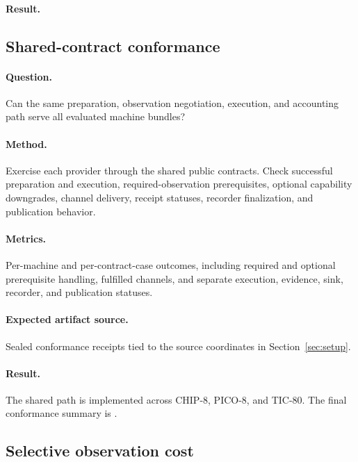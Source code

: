 \paragraph{Result.} \TBASourceCoordinates

\subsection{Shared-contract conformance}
\label{sec:conformance}

\paragraph{Question.} Can the same preparation, observation negotiation,
execution, and accounting path serve all evaluated machine bundles?

\paragraph{Method.} Exercise each provider through the shared public
contracts. Check successful preparation and execution, required-observation
prerequisites, optional capability downgrades, channel delivery, receipt
statuses, recorder finalization, and publication behavior.

\paragraph{Metrics.} Per-machine and per-contract-case outcomes, including
required and optional prerequisite handling, fulfilled channels, and
separate execution, evidence, sink, recorder, and publication statuses.

\paragraph{Expected artifact source.} Sealed conformance receipts tied to the
source coordinates in Section~\ref{sec:setup}.

\paragraph{Result.} The shared path is implemented across CHIP-8, PICO-8, and
TIC-80. The final conformance summary is \TBAConformanceResult.

\subsection{Selective observation cost}
\label{sec:observation-cost}

